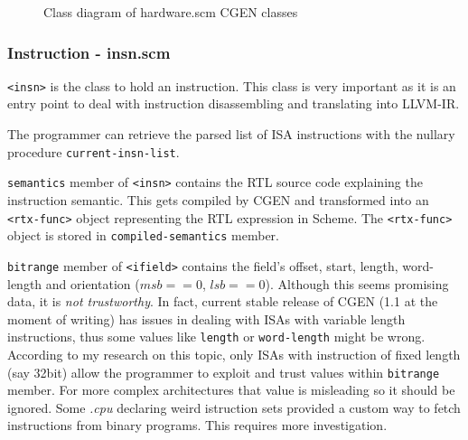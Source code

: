 \documentclass{article}
\begin{document}
\begin{figure}[H]
	\centering
	\caption{Class diagram of hardware.scm CGEN classes}
	\label{fig:hw-base}
\end{figure}

\subsubsection{Instruction - insn.scm}
\texttt{<insn>} is the class to hold an instruction. This class is very important as it is an entry point to deal with instruction disassembling and translating into LLVM-IR.

The programmer can retrieve the parsed list of ISA instructions with the nullary procedure \texttt{current-insn-list}.

\texttt{semantics} member of \texttt{<insn>} contains the RTL source code explaining the instruction semantic. This gets compiled by CGEN and transformed into an \texttt{<rtx-func>} object representing the RTL expression in Scheme. The \texttt{<rtx-func>} object is stored in \texttt{compiled-semantics} member.

\texttt{bitrange} member of \texttt{<ifield>} contains the field's offset, start, length, word-length and orientation ($msb==0$, $lsb==0$). Although this seems promising data, it is \emph{not trustworthy}. In fact, current stable release of CGEN (1.1 at the moment of writing) has issues in dealing with ISAs with variable length instructions, thus some values like \texttt{length} or \texttt{word-length} might be wrong. According to my research on this topic, only ISAs with instruction of fixed length (say 32bit) allow the programmer to exploit and trust values within \texttt{bitrange} member. For more complex architectures that value is misleading so it should be ignored.
Some \emph{.cpu} declaring weird istruction sets provided a custom way to fetch instructions from binary programs. This requires more investigation.
\end{document}
